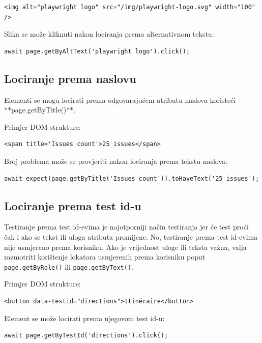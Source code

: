 \begin{verbatim}
<img alt="playwright logo" src="/img/playwright-logo.svg" width="100" />
\end{verbatim}

Slika se može kliknuti nakon lociranja prema alternativnom tekstu:

\begin{verbatim}
await page.getByAltText('playwright logo').click();
\end{verbatim}

\subsection*{Lociranje prema naslovu}

Elementi se mogu locirati prema odgovarajućem atributu naslova koristeći **page.getByTitle()**.

Primjer DOM strukture:

\begin{verbatim}
<span title='Issues count'>25 issues</span>
\end{verbatim}

Broj problema može se provjeriti nakon lociranja prema tekstu naslova:

\begin{verbatim}
await expect(page.getByTitle('Issues count')).toHaveText('25 issues');
\end{verbatim}

\subsection*{Lociranje prema test id-u}

Testiranje prema test id-evima je najotporniji način testiranja jer će test proći čak i ako se tekst ili uloga atributa promijene.
No, testiranje prema test id-evima nije usmjereno prema korisniku.
Ako je vrijednost uloge ili teksta važna, valja razmotriti korištenje lokatora usmjerenih prema korisniku poput \texttt{page.getByRole()} ili \texttt{page.getByText()}.

Primjer DOM strukture:

\begin{verbatim}
<button data-testid="directions">Itinéraire</button>
\end{verbatim}

Element se može locirati prema njegovom test id-u:

\begin{verbatim}
await page.getByTestId('directions').click();
\end{verbatim}

